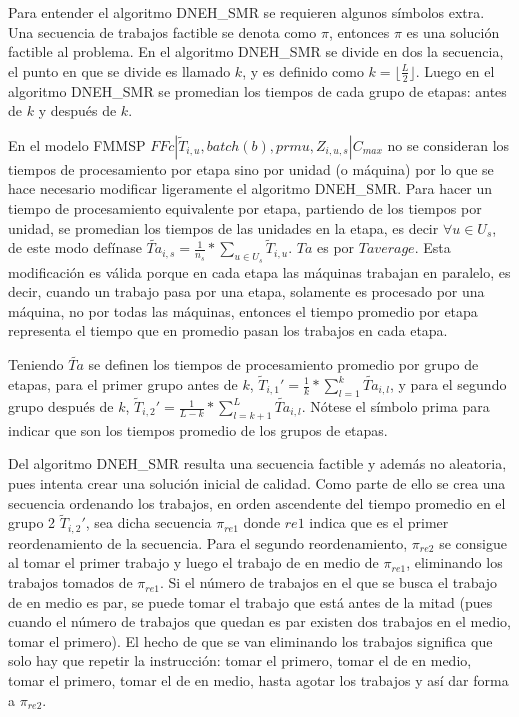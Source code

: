 \documentclass{article}
\def\notac_modelo{$FFc | \tilde{T}_{i, u}, batch(b), prmu, Z_{i, u, s} | C_{max}$}
\begin{document}
\vspace{\baselineskip}
Para entender el algoritmo DNEH\_SMR se requieren algunos símbolos extra. Una secuencia de trabajos factible se denota como $\pi$, entonces $\pi$ es una solución factible al problema. En el algoritmo DNEH\_SMR se divide en dos la secuencia, el punto en que se divide es llamado $k$, y es definido como $k = \lfloor\frac{L}{2}\rfloor$. Luego en el algoritmo DNEH\_SMR se promedian los tiempos de cada grupo de etapas: antes de $k$ y después de $k$. \autocite{algMNIG}

\vspace{\baselineskip}
En el modelo FMMSP \notac_modelo no se consideran los tiempos de procesamiento por etapa sino por unidad (o máquina) por lo que se hace necesario modificar ligeramente el algoritmo DNEH\_SMR. Para hacer un tiempo de procesamiento equivalente por etapa, partiendo de los tiempos por unidad, se promedian los tiempos de las unidades en la etapa, es decir $\forall u \in U_{s}$, de este modo defínase $\widetilde{Ta}_{i,s} = \frac{1}{n_s} *\sum_{u \in U_{s}} \widetilde{T}_{i,u}$. $Ta$ es por $T average$. Esta modificación es válida porque en cada etapa las máquinas trabajan en paralelo, es decir, cuando un trabajo pasa por una etapa, solamente es procesado por una máquina, no por todas las máquinas, entonces el tiempo promedio por etapa representa el tiempo que en promedio pasan los trabajos en cada etapa.

\vspace{\baselineskip}
Teniendo $\widetilde{Ta}$ se definen los tiempos de procesamiento promedio por grupo de etapas, para el primer grupo antes de $k$, $\widetilde{T}_{i,1}' = \frac{1}{k}*\sum_{l=1}^{k} \widetilde{Ta}_{i,l}$, y para el segundo grupo después de $k$, $\widetilde{T}_{i,2}' = \frac{1}{L-k}*\sum_{l = k+1}^{L} \widetilde{Ta}_{i,l}$. Nótese el símbolo prima para indicar que son los tiempos promedio de los grupos de etapas. \autocite{algMNIG}

\vspace{\baselineskip}
Del algoritmo DNEH\_SMR resulta una secuencia factible y además no aleatoria, pues intenta crear una solución inicial de calidad. Como parte de ello se crea una secuencia ordenando los trabajos, en orden ascendente del tiempo promedio en el grupo 2 $\widetilde{T}_{i,2}'$, sea dicha secuencia $\pi_{re1}$ donde $re1$ indica que es el primer reordenamiento de la secuencia. Para el segundo reordenamiento, $\pi_{re2}$ se consigue al tomar el primer trabajo y luego el trabajo de en medio de $\pi_{re1}$, eliminando los trabajos tomados de $\pi_{re1}$. Si el número de trabajos en el que se busca el trabajo de en medio es par, se puede tomar el trabajo que está antes de la mitad (pues cuando el número de trabajos que quedan es par existen dos trabajos en el medio, tomar el primero). El hecho de que se van eliminando los trabajos significa que solo hay que repetir la instrucción: tomar el primero, tomar el de en medio, tomar el primero, tomar el de en medio, hasta agotar los trabajos y así dar forma a $\pi_{re2}$. \autocite{algMNIG}
\end{document}
